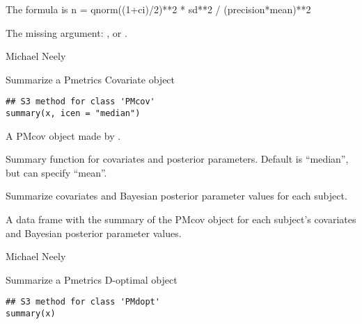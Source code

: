 \documentclass[a4paper]{book}
\begin{document}
%
\begin{Details}\relax
The formula is n = qnorm((1+ci)/2)**2 * sd**2 / (precision*mean)**2
\end{Details}
%
\begin{Value}
The missing argument: ,  or .
\end{Value}
%
\begin{Author}\relax
Michael Neely
\end{Author}
%
\begin{Description}\relax
Summarize a Pmetrics Covariate object
\end{Description}
%
\begin{Usage}
\begin{verbatim}
## S3 method for class 'PMcov'
summary(x, icen = "median")
\end{verbatim}
\end{Usage}
%
\begin{Arguments}
\begin{ldescription}
\item[\code{x}] A PMcov object made by .

\item[\code{icen}] Summary function for covariates and posterior parameters. Default is ``median'', but can specify ``mean''.
\end{ldescription}
\end{Arguments}
%
\begin{Details}\relax
Summarize covariates and Bayesian posterior parameter values for each subject.
\end{Details}
%
\begin{Value}
A data frame with the summary of the PMcov object for each subject's covariates and 
Bayesian posterior parameter values.
\end{Value}
%
\begin{Author}\relax
Michael Neely
\end{Author}
%
\begin{SeeAlso}\relax
{}
\end{SeeAlso}
%
\begin{Description}\relax
Summarize a Pmetrics D-optimal object
\end{Description}
%
\begin{Usage}
\begin{verbatim}
## S3 method for class 'PMdopt'
summary(x)
\end{verbatim}
\end{Usage}
\end{document}
